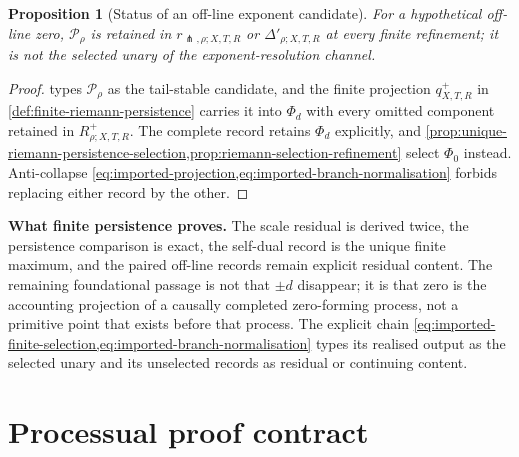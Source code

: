 \documentclass[11pt,a4paper]{article}
\newtheorem{proposition}[theorem]{Proposition}
\theoremstyle{definition}
\begin{document}
\begin{proposition}[Status of an off-line exponent candidate]
\label{prop:off-line-candidate-status}
For a hypothetical off-line zero, $\mathcal P_\rho$ is retained in
$r_{\pitchfork,\rho;X,T,R}$ or $\Delta'_{\rho;X,T,R}$ at every finite
refinement;
it is not the selected unary of the exponent-resolution channel.
\end{proposition}

\begin{proof}
 types $\mathcal P_\rho$ as the
tail-stable candidate, and the finite projection $q_{X,T,R}^{+}$ in
\cref{def:finite-riemann-persistence} carries it into $\Phi_d$ with every
omitted component retained in $R_{\rho;X,T,R}^{+}$. The complete record retains
$\Phi_d$ explicitly, and
\cref{prop:unique-riemann-persistence-selection,prop:riemann-selection-refinement}
select $\Phi_0$ instead. Anti-collapse
\cref{eq:imported-projection,eq:imported-branch-normalisation} forbids replacing
either record by the other.
\end{proof}

\begin{reviewbox}
\textbf{What finite persistence proves.}
The scale residual is derived twice, the persistence comparison is exact, the
self-dual record is the unique finite maximum, and the paired off-line records
remain explicit residual content. The remaining foundational passage is not
that $\pm d$ disappear; it is that zero is the accounting projection of a
causally completed zero-forming process, not a primitive point that exists
before that process. The explicit chain
\cref{eq:imported-finite-selection,eq:imported-branch-normalisation} types its
realised output as the selected unary and its unselected records as residual
or continuing content.
\end{reviewbox}

\section{Processual proof contract}
\label{sec:proof-contract}
\end{document}

